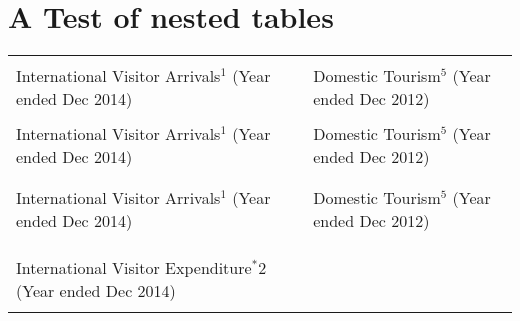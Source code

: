 \documentclass{mbie-article}\usepackage[]{graphicx}\usepackage[]{color}
\begin{document}
\section*{A Test of nested tables}

\fontsize{7pt}{8.4pt}

\begin{tabular}[t]{p{8.5cm} p{0.05cm} p{8.5cm} }
&& \\
\cellcolor{black} {\color{white} International Visitor Arrivals$^1$ (Year ended Dec 2014) }
& 
&
\cellcolor{lightgray} Domestic Tourism$^5$ (Year ended Dec 2012)\\


  
&
&



 \\
\cellcolor{lightgray} International Visitor Arrivals$^1$ (Year ended Dec 2014) 
& 
&
\cellcolor{lightgray} Domestic Tourism$^5$ (Year ended Dec 2012)\\
&& \\

&
&


\\
\cellcolor{lightgray} International Visitor Arrivals$^1$ (Year ended Dec 2014) 
& 
&
\cellcolor{lightgray} Domestic Tourism$^5$ (Year ended Dec 2012)\\

&& \\


&
&  
\multirow{4}{*}{  

}

\\
&
&
\\
\cellcolor{lightgray}  
International Visitor Expenditure$^*2$ (Year ended Dec 2014) 
&
&
\\


&
& 
\\
  
\end{tabular}
 
\end{document}
